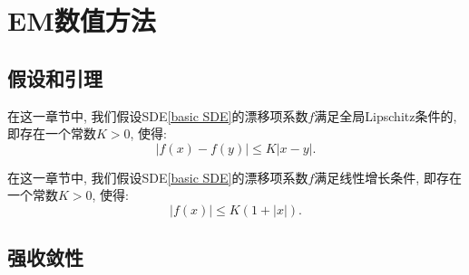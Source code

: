 

\chapter{EM数值方法}

\section{假设和引理}
\begin{assumption}\label{Lipschitz}
	在这一章节中, 我们假设SDE\cref{basic SDE}的漂移项系数$f$满足全局\textnormal{Lipschitz}条件的, 即存在一个常数$K>0$, 使得:
	\begin{equation}
		|f(x)-f(y)| \le K|x-y|. 
	\end{equation}
\end{assumption}

\begin{assumption}\label{linear growth}
	在这一章节中, 我们假设SDE\cref{basic SDE}的漂移项系数$f$满足线性增长条件, 即存在一个常数$K>0$, 使得:
	\begin{equation}
		|f(x)| \le K(1+|x|). 
	\end{equation}
\end{assumption}

\section{强收敛性}


